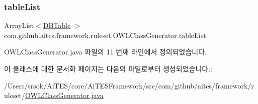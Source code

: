 \subsubsection{\texorpdfstring{table\+List}{tableList}}
{\footnotesize\ttfamily Array\+List$<$\mbox{\hyperlink{classcom_1_1github_1_1aites_1_1framework_1_1dbcomponent_1_1_d_b_table}{D\+B\+Table}} $>$ com.\+github.\+aites.\+framework.\+ruleset.\+O\+W\+L\+Class\+Generator.\+table\+List\hspace{0.3cm}{\ttfamily [private]}}



O\+W\+L\+Class\+Generator.\+java 파일의 11 번째 라인에서 정의되었습니다.



이 클래스에 대한 문서화 페이지는 다음의 파일로부터 생성되었습니다.\+:\begin{DoxyCompactItemize}
\item 
/\+Users/srsok/\+Ai\+T\+E\+S/core/\+Ai\+T\+E\+S\+Framework/src/com/github/aites/framework/ruleset/\mbox{\hyperlink{_o_w_l_class_generator_8java}{O\+W\+L\+Class\+Generator.\+java}}\end{DoxyCompactItemize}
